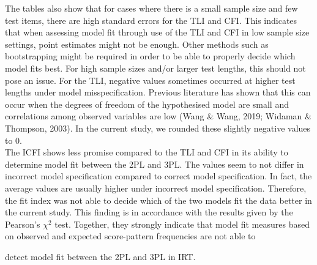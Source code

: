 \documentclass[Royal,sageapa,times,doublespace]{sagej}
\begin{document}
\indent The tables also show that for cases where there is a small sample size and few test items, there are high standard errors for the TLI and CFI. This indicates that when assessing model fit through use of the TLI and CFI in low sample size settings, point estimates might not be enough. Other methods such as bootstrapping might be required in order to be able to properly decide which model fits best. For high sample sizes and/or larger test lengths, this should not pose an issue. For the TLI, negative values sometimes occurred at higher test lengths under model misspecification. Previous literature has shown that this can occur when the degrees of freedom of the hypothesised model are small and correlations among observed variables are low (Wang \& Wang, 2019; Widaman \& Thompson, 2003). In the current study, we rounded these slightly negative values to 0. \\
\indent The ICFI shows less promise compared to the TLI and CFI in its ability to determine model fit between the 2PL and 3PL. The values seem to not differ in incorrect model specification compared to correct model specification. In fact, the average values are usually higher under incorrect model specification. Therefore, the fit index was not able to decide which of the two models fit the data better in the current study. This finding is in accordance with the results given by the Pearson's $\chi^2$ test. Together, they strongly indicate that model fit measures based on observed and expected score-pattern frequencies are not able to 

detect model fit between the 2PL and 3PL in IRT. \\ %
\end{document}
